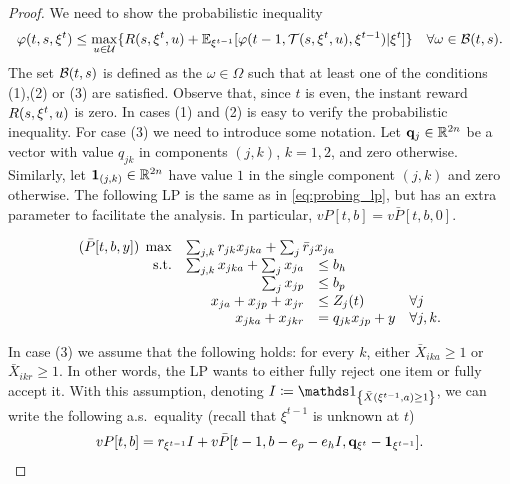 \begin{proof}
We need to show the probabilistic inequality
\[
\varphi(t,s,\xi^t) \leq \max_{u\in\mathcal{U}}\{R(s,\xi^t,u)+\mathbb{E}_{\xi^{t-1}}[\varphi(t-1,\mathcal{T}(s,\xi^t,u),\xi^{t-1})|\xi^t]\} \quad \forall \omega\in\mathcal{B}(t,s).
\]
The set $\mathcal{B}(t,s)$ is defined as the $\omega\in\Omega$ such that at least one of the conditions (1),(2) or (3) are satisfied.
Observe that, since $t$ is even, the instant reward $R(s,\xi^t,u)$ is zero.
In cases (1) and (2) is easy to verify the probabilistic inequality.
For case (3) we need to introduce some notation.
Let $\mathbf q_{j}\in\mathbb{R}^{2n}$ be a vector with value $q_{jk}$ in components $(j,k)$, $k=1,2$, and zero otherwise.
Similarly, let $\mathbf 1_{(j,k)}\in\mathbb{R}^{2n}$ have value $1$ in the single component $(j,k)$ and zero otherwise.
The following LP is the same as in \cref{eq:probing_lp}, but has an extra parameter to facilitate the analysis.
In particular, $vP[t,b]=v\bar P[t,b,0]$.

\begin{equation}
\begin{array}{rrll}
(\bar P[t,b,y]) \; \max & \multicolumn{3}{l}{\sum_{j,k}r_{jk}x_{jka}+ \sum_j \bar r_jx_{ja}} \\
\text{s.t.}& \sum_{j,k}x_{jka}+\sum_jx_{ja} &\leq b_h  \\
&  \sum_j x_{jp} & \leq b_p   \\
&  x_{ja} +x_{jp} +x_{jr} & \leq Z_j(t)  & \forall j \\
& x_{jka} +x_{jkr} &= q_{jk}x_{jp}+y &  \forall j,k.
\end{array}
\end{equation}

In case (3) we assume that the following holds: for every $k$, either $\bar X_{ika}\geq 1$ or $\bar X_{ikr}\geq 1$.
In other words, the LP wants to either fully reject one item or fully accept it.
With this assumption, denoting $I\defeq \In{\bar X(\xi^{t-1},a)\geq 1} $, we can write the following  a.s.\ equality (recall that $\xi^{t-1}$ is unknown at $t$)
\[
vP[t,b] = r_{\xi^{t-1}}I + v\bar P[t-1,b-e_p-e_hI,\mathbf q_{\xi^t}-\mathbf 1_{\xi^{t-1}}].
\]


\end{proof}
